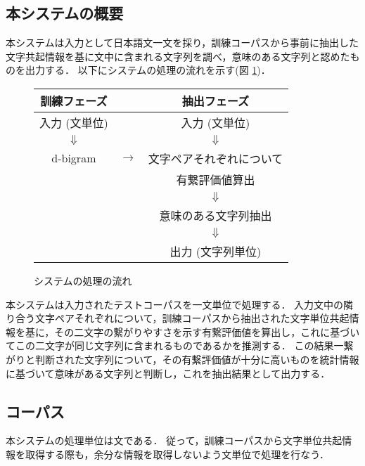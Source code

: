 \subsection{本システムの概要}
本システムは入力として日本語文一文を採り，訓練コーパスから事前に抽出した文字共起情報を基に文中に含まれる文字列を調べ，意味のある文字列と認めたものを出力する．
以下にシステムの処理の流れを示す(図 \ref{fig:flo})．
\begin{figure}[hbt]
\begin{minipage}{\textwidth}
\begin{center}
\begin{tabular}{ccc}
\hline
\hline
訓練フェーズ  &                   & 抽出フェーズ             \\
\hline
入力 (文単位) &                   & 入力 (文単位)            \\
$\Downarrow$  &                   & $\Downarrow$             \\
d-bigram      & $\longrightarrow$ & 文字ペアそれぞれについて \\
              &                   & 有繋評価値算出           \\
              &                   & $\Downarrow$             \\
              &                   & 意味のある文字列抽出     \\
              &                   & $\Downarrow$             \\
              &                   & 出力 (文字列単位)        \\
\hline
\hline
\end{tabular}
\caption{システムの処理の流れ}
\label{fig:flo}
\end{center}
\end{minipage}
\end{figure}
本システムは入力されたテストコーパスを一文単位で処理する．
入力文中の隣り合う文字ペアそれぞれについて，訓練コーパスから抽出された文字単位共起情報を基に，その二文字の繋がりやすさを示す有繋評価値を算出し，これに基づいてこの二文字が同じ文字列に含まれるものであるかを推測する．
この結果一繋がりと判断された文字列について，その有繋評価値が十分に高いものを統計情報に基づいて意味がある文字列と判断し，これを抽出結果として出力する．
\subsection{コーパス}
\label{sec:corpus_form}
本システムの処理単位は文である．
従って，訓練コーパスから文字単位共起情報を取得する際も，余分な情報を取得しないよう文単位で処理を行なう．

